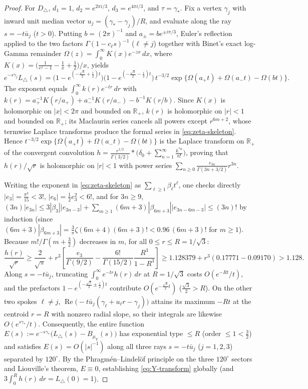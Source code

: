 \documentclass[11pt,reqno]{amsart}
\theoremstyle{definition}
\theoremstyle{remark}
\newcommand{\R}{\mathbb{R}}
\begin{document}
\begin{proof}
For $D_\triangle$, $d_1 = 1$, $d_2 = e^{2\pi i/3}$, $d_3 = e^{4\pi i/3}$, and $\tau = \gamma_*$. Fix a vertex $\gamma_j$ with inward unit median vector $u_j = (\gamma_* - \gamma_j)/R$, and evaluate along the ray $s = -t \bar u_j$ ($t > 0$). Putting $b = (2\pi)^{-1}$ and $a_\pm = b e^{\pm i\pi/3}$, Euler's reflection applied to the two factors $\Gamma(1 - c_\ell s)^{-1}$ ($\ell \ne j$) together with Binet's exact log-Gamma remainder $\Omega(z) = \int_0^\infty K(x) e^{-zx}\,dx$, where $K(x) = \bigl(\frac{1}{e^x - 1} - \frac{1}{x} + \frac{1}{2}\bigr)/x$, yields
\[
  e^{-s\gamma_j} L_\triangle(s) = \bigl(1 - e^{(-\frac{\sqrt 3}{2} + \frac{i}{2})t}\bigr)\bigl(1 - e^{(-\frac{\sqrt 3}{2} - \frac{i}{2})t}\bigr)\, t^{-3/2} \exp\bigl\{\Omega(a_+ t) + \Omega(a_- t) - \Omega(b t)\bigr\}.
\]
The exponent equals $\int_0^\infty k(r) e^{-tr}\,dr$ with $k(r) = a_+^{-1}K(r/a_+) + a_-^{-1}K(r/a_-) - b^{-1}K(r/b)$. Since $K(x)$ is holomorphic on $|x| < 2\pi$ and bounded on $\R_+$, $k(r)$ is holomorphic on $|r| < 1$ and bounded on $\R_+$; its Maclaurin series cancels all powers except $r^{6m+2}$, whose termwise Laplace transforms produce the formal series in \eqref{eq:zeta-skeleton}. Hence $t^{-3/2}\exp\{\Omega(a_+ t)+\Omega(a_- t)-\Omega(b t)\}$ is the Laplace transform on $\R_+$ of the convergent convolution $h = \frac{r^{1/2}}{\Gamma(3/2)} * \bigl(\delta_0 + \sum_{n=1}^\infty \frac{k^{*n}}{n!}\bigr)$, proving that $h(r)/\sqrt r$ is holomorphic on $|r| < 1$ with power series $\sum_{n\ge 0} \frac{e_{3n}}{\Gamma(3n+3/2)} r^{3n}$.

Writing the exponent in \eqref{eq:zeta-skeleton} as $\sum_{\ell\ge 1}\beta_\ell t^\ell$, one checks directly $|e_3| = \frac{\pi^3}{15} < 3!$, $|e_6| = \frac12 e_3^2 < 6!$, and for $3n \ge 9$, $(3n)|e_{3n}| \le 3|\beta_3||e_{3n-3}| + \sum_{m\ge 1}(6m+3)|\beta_{6m+3}||e_{3n-6m-3}| \le (3n)!$ by induction (since $(6m+3)|\beta_{6m+3}| = \frac{3}{\pi}\zeta(6m+4)(6m+3)! < 0.96\,(6m+3)!$ for $m \ge 1$). Because $m!/\Gamma(m + \frac32)$ decreases in $m$, for all $0 \le r \le R = 1/\sqrt 3$:
\[
  \frac{h(r)}{\sqrt r} \ge \frac{2}{\sqrt\pi} + r^3\left[\frac{e_3}{\Gamma(9/2)} - \frac{6!}{\Gamma(15/2)}\frac{R^3}{1 - R^3}\right]
  \ge 1.128379 + r^3(0.17771 - 0.09170) > 1.128.
\]
Along $s = -t \bar u_j$, truncating $\int_0^\infty e^{-tr} h(r)\,dr$ at $R = 1/\sqrt 3$ costs $O(e^{-Rt}/t)$, and the prefactors $1 - e^{(-\frac{\sqrt 3}{2}\pm\frac{i}{2})t}$ contribute $O(e^{-\frac{\sqrt 3}{2}t})$ ($\frac{\sqrt 3}{2} > R$). On the other two spokes $\ell \ne j$, $\operatorname{Re}\bigl(-t\bar u_j(\gamma_\ell + u_\ell r - \gamma_j)\bigr)$ attains its maximum $-Rt$ at the centroid $r = R$ with nonzero radial slope, so their integrals are likewise $O(e^{s\gamma_*}/t)$. Consequently, the entire function $E(s) := e^{-s\gamma_*}\bigl(L_\triangle(s) - B_{\mu_{\mathrm{Y}}}(s)\bigr)$ has exponential type $\le R$ (order $\le 1 < \frac32$) and satisfies $E(s) = O(|s|^{-1})$ along all three rays $s = -t\bar u_j$ ($j = 1, 2, 3$) separated by $120^\circ$. By the Phragm\'en--Lindel\"of principle on the three $120^\circ$ sectors and Liouville's theorem, $E \equiv 0$, establishing \eqref{eq:Y-transform} globally (and $3\int_0^R h(r)\,dr = L_\triangle(0) = 1$).


\end{proof}
\end{document}
